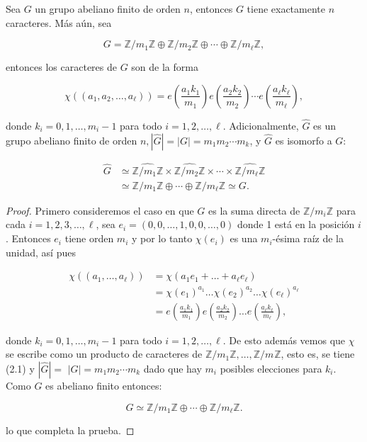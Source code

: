 \begin{theorem}[Dualidad]\label{dualidad}
Sea $G$ un grupo abeliano finito de orden $n$, entonces $G$ tiene exactamente $n$ caracteres. Más aún, sea

$$
G=\mathbb{Z} / m_1 \mathbb{Z} \oplus \mathbb{Z} / m_2 \mathbb{Z} \oplus \cdots \oplus \mathbb{Z} / m_{\ell} \mathbb{Z}
,$$

entonces los caracteres de $G$ son de la forma

$$
\chi\left(\left(a_1, a_2, \ldots, a_{\ell}\right)\right)=e\left(\frac{a_1 k_1}{m_1}\right) e\left(\frac{a_2 k_2}{m_2}\right) \cdots e\left(\frac{a_{\ell} k_{\ell}}{m_{\ell}}\right),
$$

donde $k_i=0,1, \ldots, m_i-1$ para todo $i=1,2, \ldots, \ell$. Adicionalmente, $\widehat{G}$ es un grupo abeliano finito de orden $n,|\widehat{G}|=|G|=m_1 m_2 \cdots m_k$, y $\widehat{G}$ es isomorfo a $G$:

\begin{equation}
\begin{aligned}
\widehat{G} & \simeq \widehat{\mathbb{Z} / m_1 \mathbb{Z}} \times \widehat{\mathbb{Z} / m_2 \mathbb{Z}} \times \cdots \times \widehat{\mathbb{Z} / m_{\ell} \mathbb{Z}} \\
& \simeq \mathbb{Z} / m_1 \mathbb{Z} \oplus \cdots \oplus \mathbb{Z} / m_{\ell} \mathbb{Z} \simeq G.
\end{aligned}
\end{equation}

\end{theorem}

\begin{proof}
Primero consideremos el caso en que $G$ es la suma directa de $\mathbb{Z} / m_i \mathbb{Z}$ para cada $i=1,2,3, \ldots, \ell$, sea $e_i=(0,0, \ldots, 1,0,0, \ldots, 0)$ donde 1 está en la posición $i$. Entonces $e_i$ tiene orden $m_i$ y  por lo tanto $\chi\left(e_i\right)$ es una $m_i$-ésima raíz de la unidad, así pues

\begin{align*}
    \chi\left(\left(a_1,\ldots,a_{\ell}\right)\right)&=\chi(a_1e_1+\ldots +a_{\ell}e_{\ell})\\
    &=\chi(e_1)^{a_1}\ldots\chi(e_2)^{a_2}\ldots\chi(e_{\ell})^{a_{\ell}}\\
    &=e\left(\frac{a_1k_1}{m_1}\right)e\left(\frac{a_2k_2}{m_2}\right)\ldots e\left(\frac{a_{\ell}k_{\ell}}{m_{\ell}}\right)
,\end{align*}

donde $k_i=0,1, \ldots, m_i-1$ para todo $i=1,2, \ldots, \ell$. De esto además vemos que $\chi$ se escribe como un producto de caracteres de $\mathbb{Z} / m_1 \mathbb{Z}, \ldots, \mathbb{Z} / m_{}\mathbb{Z}$, esto es, se tiene (2.1) y $|\widehat{G}|=$ $|G|=m_1 m_2 \cdots m_k$ dado que hay $m_i$ posibles elecciones para $k_i$. Como $G$ es abeliano finito entonces:

$$
G \simeq \mathbb{Z} / m_1 \mathbb{Z} \oplus \cdots \oplus \mathbb{Z} / m_{\ell}\mathbb{Z}.
$$

lo que completa la prueba.
\end{proof}


